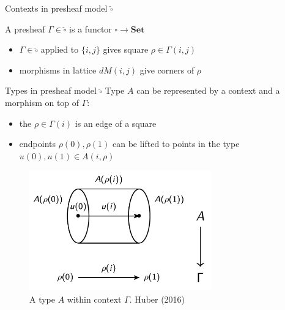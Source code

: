 \documentclass[english,handout]{beamer}
\newcommand{\incfig}[1]{%
    \def\svgwidth{\columnwidth}
    {#1.pdf_tex}
}
\begin{document}
\begin{frame}{Contexts in presheaf model $\widehat{\square}$}
 

    \begin{example}
        A presheaf $\Gamma \in \widehat{\square}$ is a functor $\square \rightarrow \mathbf{Set}$

        \begin{itemize}
            \item $\Gamma \in \widehat{\square}$ applied to $\{i,j\}$ gives square $\rho \in \Gamma (i,j)$
            \item morphisms in lattice $dM(i,j)$ give corners of $\rho$

        \end{itemize}
        \begin{figure}
            
            
        \end{figure}
    \end{example}
 
\end{frame}

\begin{frame}{Types in presheaf model $\widehat{\square}$}
    Type $A$ can be represented by a context and a morphism on top of $\Gamma$:
    \begin{itemize}
        \item the $\rho \in \Gamma (i)$ is an edge of a square
        \item endpoints $\rho (0), \rho (1)$ can be lifted to points in the type $u(0),u(1) \in A(i,\rho)$
    \end{itemize}

 \begin{figure}
\centering
\includegraphics[width=0.7\textwidth]{figures/types}
\caption{A type $A$ within context $\Gamma$. Huber (2016)}
 \end{figure}
 
\end{frame}
\end{document}
